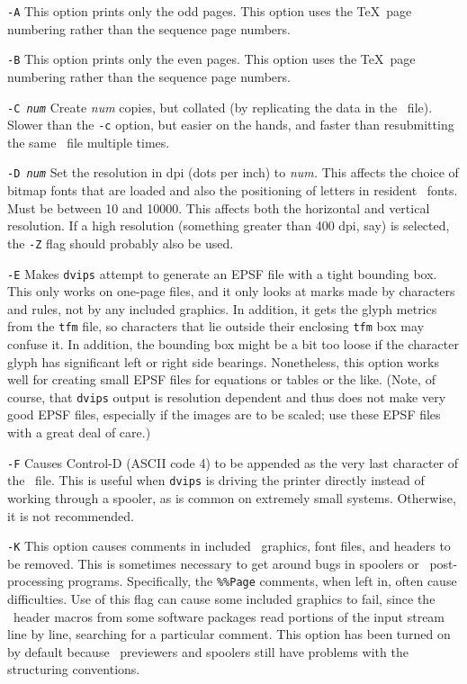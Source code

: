 \begin{list}
\item [\tt -A]
This option prints only the odd pages.  This option uses the \TeX\
page numbering rather than the sequence page numbers.

\item [\tt -B]
This option prints only the even pages.  This option uses the \TeX\
page numbering rather than the sequence page numbers.

\item [\tt -C \em num]
Create {\it num}
copies, but collated (by replicating the data in the \PS\ file).
Slower than the {\tt -c} option, but easier on the hands, and faster than
resubmitting the same \PS\ file multiple times.

\item [\tt -D \em num]
Set the resolution in dpi (dots per inch) to {\it num.}
This affects the choice of bitmap fonts that are loaded and also the positioning
of letters in resident \PS\ fonts. Must be between 10 and 10000.
This affects both the horizontal and vertical resolution.  If a high resolution
(something greater than 400 dpi, say) is selected, the {\tt -Z} flag should
probably also be used.

\item [\tt -E]
Makes {\tt dvips} attempt to generate an EPSF file with a tight bounding
box.  This only works on one-page files, and it only looks at marks made
by characters and rules, not by any included graphics.  In addition, it
gets the glyph metrics from the {\tt tfm} file, so characters that
lie outside their enclosing {\tt tfm} box may confuse it.  In addition,
the bounding box might be a bit too loose if the character glyph has
significant left or right side bearings.  Nonetheless, this option works
well for creating small EPSF files for equations or tables or the like.
(Note, of course, that {\tt dvips} output is resolution dependent and
thus does not make very good EPSF files, especially if the images are
to be scaled; use these EPSF files with a great deal of care.)

\item [\tt -F]
Causes Control-D (ASCII code 4) to be appended as the very last character
of the \PS\ file.  This is useful when {\tt dvips}
is driving the printer directly instead of working through a spooler,
as is common on extremely small systems.  Otherwise, it is not recommended.

\item [\tt -K]
This option causes comments in included \PS\ graphics, font files,
and headers to be removed.  This is sometimes necessary to get around bugs
in spoolers or \PS\ post-processing programs.  Specifically, the
{\tt \%\%Page} comments, when left in, often cause difficulties.
Use of this flag can cause some included graphics to fail, since the
\PS\ header macros from some software packages read portions of
the input stream line by line, searching for a particular comment.
This option has been turned on by default because \PS\ previewers
and spoolers still have problems with the structuring conventions.


\end{list}

